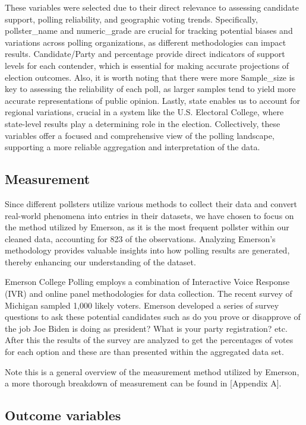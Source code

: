 \documentclass[
  letterpaper,
  DIV=11,
  numbers=noendperiod]{scrartcl}
\begin{document}
These variables were selected due to their direct relevance to assessing
candidate support, polling reliability, and geographic voting trends.
Specifically, pollster\_name and numeric\_grade are crucial for tracking
potential biases and variations across polling organizations, as
different methodologies can impact results. Candidate/Party and
percentage provide direct indicators of support levels for each
contender, which is essential for making accurate projections of
election outcomes. Also, it is worth noting that there were more
Sample\_size is key to assessing the reliability of each poll, as larger
samples tend to yield more accurate representations of public opinion.
Lastly, state enables us to account for regional variations, crucial in
a system like the U.S. Electoral College, where state-level results play
a determining role in the election. Collectively, these variables offer
a focused and comprehensive view of the polling landscape, supporting a
more reliable aggregation and interpretation of the data.

\subsection{Measurement}\label{measurement}

Since different pollsters utilize various methods to collect their data
and convert real-world phenomena into entries in their datasets, we have
chosen to focus on the method utilized by Emerson, as it is the most
frequent pollster within our cleaned data, accounting for 823 of the
observations. Analyzing Emerson's methodology provides valuable insights
into how polling results are generated, thereby enhancing our
understanding of the dataset.

Emerson College Polling employs a combination of Interactive Voice
Response (IVR) and online panel methodologies for data collection. The
recent survey of Michigan sampled 1,000 likely voters. Emerson developed
a series of survey questions to ask these potential candidates such as
do you prove or disapprove of the job Joe Biden is doing as president?
What is your party registration? etc. After this the results of the
survey are analyzed to get the percentages of votes for each option and
these are than presented within the aggregated data set.

Note this is a general overview of the measurement method utilized by
Emerson, a more thorough breakdown of measurement can be found in
{[}Appendix A{]}.

\subsection{Outcome variables}\label{outcome-variables}
\end{document}

